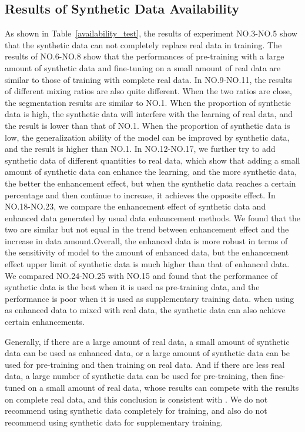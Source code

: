 \documentclass{ecai}
\begin{document}
\subsection{Results of Synthetic Data Availability}
As shown in Table~\ref{availability_test}, the results of experiment NO.3-NO.5 show that the synthetic data can not completely replace real data in training.           
The results of NO.6-NO.8 show that the performances of pre-training with a large amount of synthetic data and fine-tuning on a small amount of real data are similar to those of training with complete real data.  
In NO.9-NO.11, the results of different mixing ratios are also quite different. When the two ratios are close, the segmentation results are similar to NO.1. When the proportion of synthetic data is high, the synthetic data will interfere with the learning of real data, and the result is lower than that of NO.1. When the proportion of synthetic data is low, the generalization ability of the model can be improved by synthetic data, and the result is higher than NO.1.           
In NO.12-NO.17, we further try to add synthetic data of different quantities to real data, which show that adding a small amount of synthetic data can enhance the learning, and the more synthetic data, the better the enhancement effect, but when the synthetic data reaches a certain percentage and then continue to increase, it achieves the opposite effect. 
In NO.18-NO.23, we compare the enhancement effect of synthetic data and enhanced data generated by usual data enhancement methods. We found that the two are similar but not equal in the trend between  enhancement effect and the increase in data amount.Overall, the enhanced data is more robust in terms of the sensitivity of model to the amount of enhanced data, but the enhancement effect upper limit of synthetic data is much higher than that of enhanced data.  
We compared NO.24-NO.25 with NO.15 and found that the performance of synthetic data is the best when it is used as pre-training data, and the performance is poor when it is used as supplementary training data. when using as enhanced data to mixed with real data, the synthetic data can also achieve certain enhancements.

Generally, if there are a large amount of real data, a small amount of synthetic data can be used as enhanced data, or a large amount of synthetic data can be used for pre-training and then training on real data. And if there are less real data, a large number of synthetic data can be used for pre-training, then fine-tuned on a small amount of real data, whose results can compete with the results on complete real data, and this conclusion is consistent with \cite{4shin2018medical}. We do not recommend using synthetic data completely for training, and also do not recommend using synthetic data for supplementary training.
\end{document}
